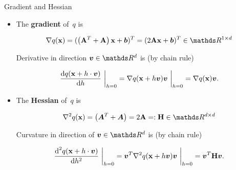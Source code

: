 \documentclass[11pt,compress,t,notes=noshow, xcolor=table]{beamer}
\begin{document}
\begin{vbframe}{Gradient and Hessian}
    
\begin{itemize}
    \item The \textbf{gradient} of~$q$ is
    
        \vspace{-0.5\baselineskip}
        
        \begin{equation*}
            \nabla q(\xv) = (\left(\Amat^T + \Amat\right) \xv + \bm{b})^T = (2 \Amat \xv + \bm{b})^T \in \R^{1\times d}
        \end{equation*}

        \vspace{-0.25\baselineskip}
    
        Derivative in direction $\bm{v}\in \R^d$ is (by chain rule)
    
        \begin{equation*}
            \frac{\text{d}q(\mathbf{x} + h \cdot \bm{v})}{\text{d}h}~\bigg\rvert_{h = 0} = \nabla q(\mathbf{x} + h \bm{v}) \bm{v}~\bigg\rvert_{h = 0} = \nabla q(\mathbf{x})\bm{v}.
        \end{equation*}

    \vspace{0.5\baselineskip}

    \item The \textbf{Hessian} of~$q$ is
        
        \vspace{-0.5\baselineskip}
        
        \begin{equation*}
            \nabla^2 q(\xv) = \left(\bm{A}^T + \bm{A}\right) = 2 \Amat =: \mathbf{H} \in \R^{d \times d}
        \end{equation*}    
        
        Curvature in direction of $\bm{v}\in \R^d$ is (by chain rule)

        \vspace{-0.5\baselineskip}
        
        \begin{equation*}
            \frac{\text{d}^2 q(\mathbf{x} + h \cdot \bm{v})}{\text{d} h^2}~\bigg\rvert_{h = 0}
            = \bm{v}^T \nabla^2 q(\mathbf{x} + h \bm{v}) \bm{v}~\bigg\rvert_{h = 0} = \bm{v}^T \mathbf{H} \bm{v}.
        \end{equation*}
\end{itemize}

\end{vbframe}
\end{document}
